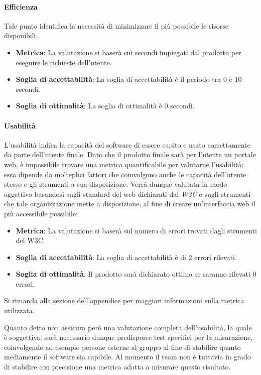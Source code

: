 \paragraph{Efficienza \color{red}{Oltre al tempo anche costo di ether???}}
Tale punto identifica la necessità di minimizzare il più possibile le risorse disponibili.
\begin{itemize}
	\item \textbf{Metrica}: La valutazione si baserà sui secondi impiegati dal prodotto per eseguire le richieste dell'utente.
	\item \textbf{Soglia di accettabilità}: La soglia di accettabilità è il periodo tra 0 e 10 secondi.
	\item \textbf{Soglia di ottimalità}: La soglia di ottimalità è 0 secondi.
\end{itemize}

\paragraph{Usabilità}
L'usabilità indica la capacità del software di essere capito e usato correttamente da parte dell'utente finale. Dato che il prodotto finale sarà per l'utente un portale web, è impossibile trovare una metrica quantificabile per valutarne l'usabilità: essa dipende da molteplici fattori che coinvolgono anche le capacità dell'utente stesso e gli strumenti a sua disposizione. Verrà dunque valutata in modo oggettivo basandosi sugli standard del web dichiarati dal \emph{W3C} e sugli strumenti che tale organizzazione mette a disposizione, al fine di creare un'interfaccia web il più accessibile possibile:

\begin{itemize}
	\item \textbf{Metrica}: La valutazione si baserà sul numero di errori trovati dagli strumenti del W3C.
	\item \textbf{Soglia di accettabilità}: La soglia di accettabilità è di 2 errori rilevati.
	\item \textbf{Soglia di ottimalità}: Il prodotto sarà dichiarato ottimo se saranno rilevati 0 errori.
\end{itemize}

Si rimanda alla sezione dell'appendice per maggiori informazioni sulla metrica utilizzata.

Quanto detto non assicura però una valutazione completa dell'usabilità, la quale è soggettiva; sarà necessario dunque predisporre test specifici per la misurazione, coinvolgendo ad esempio persone esterne al gruppo al fine di stabilire quanto mediamente il software sia capibile. Al momento il team non è tuttavia in grado di stabilire con precisione una metrica adatta a misurare questo risultato.

